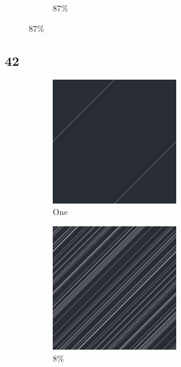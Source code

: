 \documentclass[12pt, fleqn]{report}                             %
\theoremstyle{break}                                            %
\begin{document}
\begin{figure}[ht!]
\begin{subfigure}[b]{0.4\linewidth}
          \caption{87\%}
        \end{subfigure}
      \end{figure}


      \clearpage
      \subsection{42}
      \begin{figure}[ht!]
        \centering
        \begin{subfigure}[b]{0.4\linewidth}
          \includegraphics[width=0.6\textwidth]{Images/42/a.png}
          \caption{One}
        \end{subfigure}
        \begin{subfigure}[b]{0.4\linewidth}
          \includegraphics[width=0.6\textwidth]{Images/42/b.png}
          \caption{8\%}
        \end{subfigure}
        \begin{subfigure}[b]{0.4\linewidth}

\end{subfigure}
\end{figure}
\end{document}
